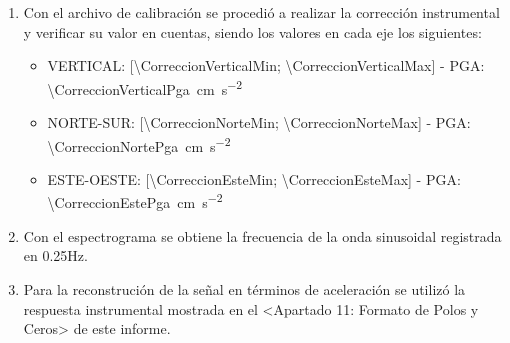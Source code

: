 \begin{table}[H]
\begin{tblr}
\begin{enumerate}
			\item Con el archivo de calibración se procedió a realizar la corrección instrumental y verificar su valor en cuentas, siendo los valores en cada eje los siguientes:
			\begin{itemize}
				\item VERTICAL: [\num{\CorreccionVerticalMin}; \num{\CorreccionVerticalMax}] - PGA: \qty{\CorreccionVerticalPga}{\centi\metre\per\square\second}
				\item NORTE-SUR: [\num{\CorreccionNorteMin}; \num{\CorreccionNorteMax}] - PGA: \qty{\CorreccionNortePga}{\centi\metre\per\square\second}
				\item ESTE-OESTE: [\num{\CorreccionEsteMin}; \num{\CorreccionEsteMax}] - PGA: \qty{\CorreccionEstePga}{\centi\metre\per\square\second}
			\end{itemize}
    		\item Con el espectrograma se obtiene la frecuencia de la onda sinusoidal registrada en 0.25Hz.
    		\item Para la reconstrución de la señal en términos de aceleración se utilizó la respuesta instrumental mostrada en el <Apartado 11: Formato de Polos y Ceros> de este informe.
    	\end{enumerate}
    \end{tblr}
\end{table}


